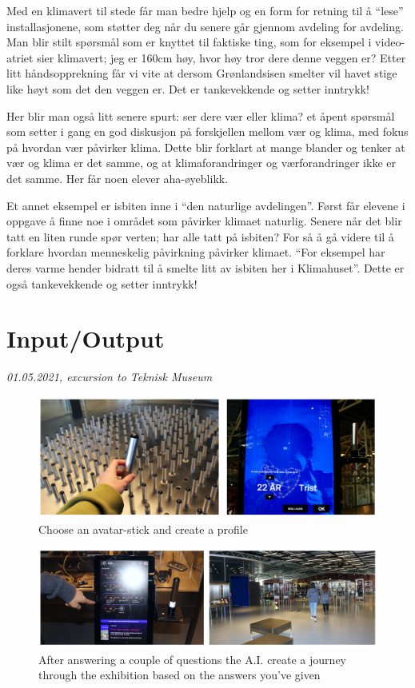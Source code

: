 Med en klimavert til stede får man bedre hjelp og en form for retning til å “lese” installasjonene, som støtter deg når du senere går gjennom avdeling for avdeling. 
Man blir stilt spørsmål som er knyttet til faktiske ting, som for eksempel i video-atriet sier klimavert; jeg er 160cm høy, hvor høy tror dere denne veggen er?
Etter litt håndsopprekning får vi vite at dersom Grønlandsisen smelter vil havet stige like høyt som det den veggen er. Det er tankevekkende og setter inntrykk!

Her blir man også litt senere spurt: ser dere vær eller klima? et åpent spørsmål som setter i gang en god diskusjon på forskjellen mellom vær og klima, med fokus på hvordan vær påvirker klima. Dette blir forklart at mange blander og tenker at vær og klima er det samme, og at klimaforandringer og værforandringer ikke er det samme. Her får noen elever aha-øyeblikk.


Et annet eksempel er isbiten inne i “den naturlige avdelingen”.  Først får elevene i oppgave å finne noe i området som påvirker klimaet naturlig. Senere når det blir tatt en liten runde spør verten; har alle tatt på isbiten? For så å gå videre til å forklare hvordan menneskelig påvirkning påvirker klimaet. “For eksempel har deres varme hender bidratt til å smelte litt av isbiten her i Klimahuset”. Dette er også tankevekkende og setter inntrykk!


\section{Input/Output}
\par
\emph{01.05.2021, excursion to Teknisk Museum}
\par

\autocite{tekniskmuseum_2022}

\begin{figure}[H]
\includegraphics[width=13cm]{pictures/process/tm_pinne.png}
\caption{Choose an avatar-stick and create a profile}
\centering 
\end{figure}

\begin{figure}[H]
\includegraphics[width=13cm]{pictures/process/tm_ai.png}
\caption{After answering a couple of questions the A.I. create a journey through the exhibition based on the answers you've given}
\centering 
\end{figure}


